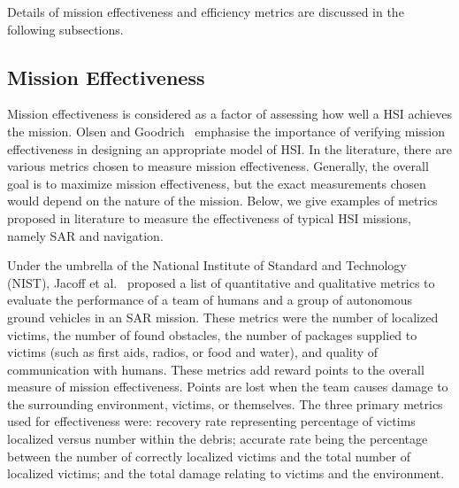 \documentclass[journal]{IEEEtran}
\begin{document}
Details of mission effectiveness and efficiency metrics are discussed in the following subsections.

\subsection{Mission Effectiveness}
Mission effectiveness is considered as a factor of assessing how well a HSI achieves the mission. Olsen and Goodrich~\cite{olsen2003metrics} emphasise the importance of verifying mission effectiveness in designing an appropriate model of HSI. In the literature, there are various metrics chosen to measure mission effectiveness. Generally, the overall goal is to maximize mission effectiveness, but the exact measurements chosen would depend on the nature of the mission. Below, we give examples of metrics proposed in literature to measure the effectiveness of typical HSI missions, namely SAR and navigation. %

Under the umbrella of the National Institute of Standard and Technology (NIST), Jacoff et al.~\cite{jacoff2001reference,jacoff2001standard} proposed a list of quantitative and qualitative metrics to evaluate the performance of a team of humans and a group of autonomous ground vehicles in an SAR mission. These metrics were the number of localized victims, the number of found obstacles, the number of packages supplied to victims (such as first aids, radios, or food and water), and quality of communication with humans. These metrics add reward points to the overall measure of mission effectiveness. Points are lost when the team causes damage to the surrounding environment, victims, or themselves. The three primary metrics used for effectiveness were: recovery rate representing percentage of victims localized versus number within the debris; accurate rate being the percentage between the number of correctly localized victims and the total number of localized victims; and the total damage relating to victims and the environment.
\end{document}

